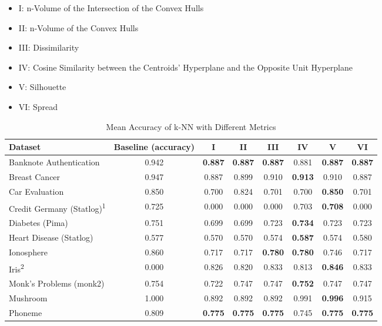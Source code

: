 \documentclass[conference]{IEEEtran}
\begin{document}
\begin{itemize}
    \item I: n-Volume of the Intersection of the Convex Hulls
    \item II: n-Volume of the Convex Hulls
    \item III: Dissimilarity
    \item IV: Cosine Similarity between the Centroids' Hyperplane and the Opposite Unit Hyperplane
    \item V: Silhouette
    \item VI: Spread
\end{itemize}

\begin{table*}[htbp]
\caption{Mean Accuracy of k-NN with Different Metrics}
\label{tab:results}
\begin{center}
\begin{tabular}{|l|c|c|c|c|c|c|c|}
\hline
\textbf{Dataset} & \textbf{Baseline (accuracy)} & \textbf{I} & \textbf{II} & \textbf{III} & \textbf{IV} & \textbf{V} & \textbf{VI} \\
\hline
Banknote Authentication & 0.942 & \textbf{0.887} & \textbf{0.887} & \textbf{0.887} & 0.881 & \textbf{0.887} & \textbf{0.887} \\
Breast Cancer & 0.947 & 0.887 & 0.899 & 0.910 & \textbf{0.913} & 0.910 & 0.887 \\
Car Evaluation & 0.850 & 0.700 & 0.824 & 0.701 & 0.700 & \textbf{0.850} & 0.701 \\
Credit Germany (Statlog)\textsuperscript{1} & 0.725 & 0.000 & 0.000 & 0.000 & 0.703 & \textbf{0.708} & 0.000 \\
Diabetes (Pima) & 0.751 & 0.699 & 0.699 & 0.723 & \textbf{0.734} & 0.723 & 0.723 \\
Heart Disease (Statlog) & 0.577 
& 0.570 & 0.570 & 0.574 & \textbf{0.587} & 0.574 & 0.580 \\
Ionosphere & 0.860 & 0.717 & 0.717 & \textbf{0.780} & \textbf{0.780} & 0.746 & 0.717 \\
Iris\textsuperscript{2} & 0.000 & 0.826 & 0.820 & 0.833 & 0.813 & \textbf{0.846} & 0.833 \\
Monk's Problems (monk2) & 0.754 & 0.722 & 0.747 & 0.747 & \textbf{0.752} & 0.747 & 0.747 \\
Mushroom & 1.000 & 0.892 & 0.892 & 0.892 & 0.991 & \textbf{0.996} & 0.915 \\
Phoneme & 0.809 & \textbf{0.775} & \textbf{0.775} & \textbf{0.775} & 0.745 & \textbf{0.775} & \textbf{0.775} \\

\end{tabular}
\end{center}
\end{table*}
\end{document}
